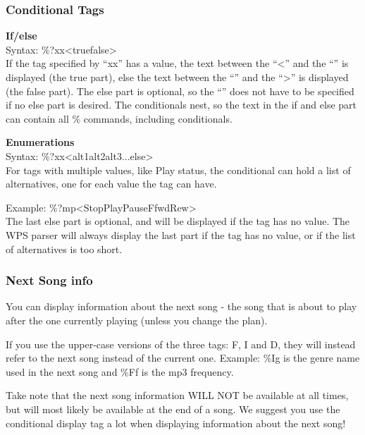 \subsubsection{Conditional Tags}

\textbf{If/else}\\

Syntax: \%?xx{\textless}true{\textbar}false{\textgreater}\\

If the tag specified by ``xx'' has a value, the text between the ``{\textless}'' and the ``{\textbar}'' is displayed (the true part), else the text between the ``{\textbar}'' and the ``{\textgreater}'' is displayed (the false part).
The else part is optional, so the ``{\textbar}'' does not have to be specified if no else part is desired. The conditionals nest, so the text in the if and else part can contain all \% commands, including conditionals.

\textbf{Enumerations}\\

Syntax: \%?xx{\textless}alt1{\textbar}alt2{\textbar}alt3{\textbar}...{\textbar}else{\textgreater}\\

For tags with multiple values, like Play status, the conditional can hold a list of alternatives, one for each value the tag can have.

Example: \%?mp{\textless}Stop{\textbar}Play{\textbar}Pause{\textbar}Ffwd{\textbar}Rew{\textgreater}\\

The last else part is optional, and will be displayed if the tag has no value. The WPS parser will always display the last part if the tag has no value, or if the list of alternatives is too short. 

\subsubsection{Next Song info}
You can display information about the next song {}- the song that is
about to play after the one currently playing (unless you change the
plan).

If you use the upper{}-case versions of the
three tags: F, I and D, they will instead refer to the next song
instead of the current one. Example: \%Ig is the genre name used in the
next song and \%Ff is the mp3 frequency. 

Take note that the next song information WILL NOT be available at all
times, but will most likely be available at the end of a song. We
suggest you use the conditional display tag a lot when displaying
information about the next song! 


